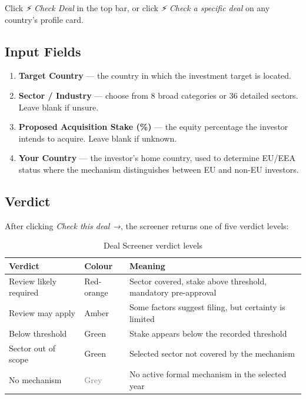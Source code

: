 \documentclass[12pt,a4paper]{article}
\newcommand{\uielem}[1]{\textit{#1}}
\begin{document}
\begin{tipbox}
Click \uielem{⚡ Check Deal} in the top bar, or click \uielem{⚡ Check a specific deal} on any country's profile card.
\end{tipbox}

\subsection{Input Fields}

\begin{enumerate}
  \item \textbf{Target Country} — the country in which the investment target is located.
  \item \textbf{Sector / Industry} — choose from 8 broad categories or 36 detailed sectors. Leave blank if unsure.
  \item \textbf{Proposed Acquisition Stake (\%)} — the equity percentage the investor intends to acquire. Leave blank if unknown.
  \item \textbf{Your Country} — the investor's home country, used to determine EU/EEA status where the mechanism distinguishes between EU and non-EU investors.
\end{enumerate}

\subsection{Verdict}

After clicking \uielem{Check this deal →}, the screener returns one of five verdict levels:

\begin{table}[h]
\centering
\begin{tabularx}{\linewidth}{llX}
\toprule
\textbf{Verdict} & \textbf{Colour} & \textbf{Meaning} \\
\midrule
Review likely required & \textcolor{prismclay}{Red-orange} & Sector covered, stake above threshold, mandatory pre-approval \\
Review may apply & \textcolor{prismamber}{Amber} & Some factors suggest filing, but certainty is limited \\
Below threshold & \textcolor{prismgreen}{Green} & Stake appears below the recorded threshold \\
Sector out of scope & \textcolor{prismgreen}{Green} & Selected sector not covered by the mechanism \\
No mechanism & \textcolor{gray}{Grey} & No active formal mechanism in the selected year \\
\bottomrule
\end{tabularx}
\caption{Deal Screener verdict levels}
\end{table}
\end{document}
